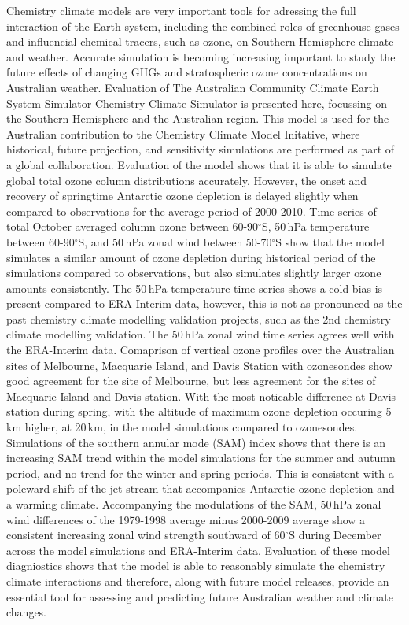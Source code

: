Chemistry climate models are very important tools for adressing the full interaction of the Earth-system, including the combined roles of greenhouse gases and influencial chemical tracers, such as ozone, on Southern Hemisphere climate and weather. Accurate simulation is becoming increasing important to study the future effects of changing GHGs and stratospheric ozone concentrations on Australian weather. Evaluation of The Australian Community Climate Earth System Simulator-Chemistry Climate Simulator is presented here, focussing on the Southern Hemisphere and the Australian region. This model is used for the Australian contribution to the Chemistry Climate Model Initative, where historical, future projection, and sensitivity simulations are performed as part of a global collaboration. Evaluation of the model shows that it is able to simulate global total ozone column distributions accurately. However, the onset and recovery of springtime Antarctic ozone depletion is delayed slightly when compared to observations for the average period of 2000-2010. Time series of total October averaged column ozone between 60-90$^\circ$S, 50\,hPa temperature between 60-90$^\circ$S, and 50\,hPa zonal wind between 50-70$^\circ$S show that the model simulates a similar amount of ozone depletion during historical period of the simulations compared to observations, but also simulates slightly larger ozone amounts consistently. The 50\,hPa temperature time series shows a cold bias is present compared to ERA-Interim data, however, this is not as pronounced as the past chemistry climate modelling validation projects, such as the 2nd chemistry climate modelling validation. The 50\,hPa zonal wind time series agrees well with the ERA-Interim data. Comaprison of vertical ozone profiles over the Australian sites of Melbourne, Macquarie Island, and Davis Station with ozonesondes show good agreement for the site of Melbourne, but less agreement for the sites of Macquarie Island and Davis station. With the most noticable difference at Davis station during spring, with the altitude of maximum ozone depletion occuring 5\,km higher, at 20\,km, in the model simulations compared to ozonesondes. Simulations of the southern annular mode (SAM) index shows that there is an increasing SAM trend within the model simulations for the summer and autumn period, and no trend for the winter and spring periods. This is consistent with a poleward shift of the jet stream that accompanies Antarctic ozone depletion and a warming climate. Accompanying the modulations of the SAM, 50\,hPa zonal wind differences of the 1979-1998 average minus 2000-2009 average show a consistent increasing zonal wind strength southward of 60$^\circ$S during December across the model simulations and ERA-Interim data. Evaluation of these model diagniostics shows that the model is able to reasonably simulate the chemistry climate interactions and therefore, along with future model releases, provide an essential tool for assessing and predicting future Australian weather and climate changes.
